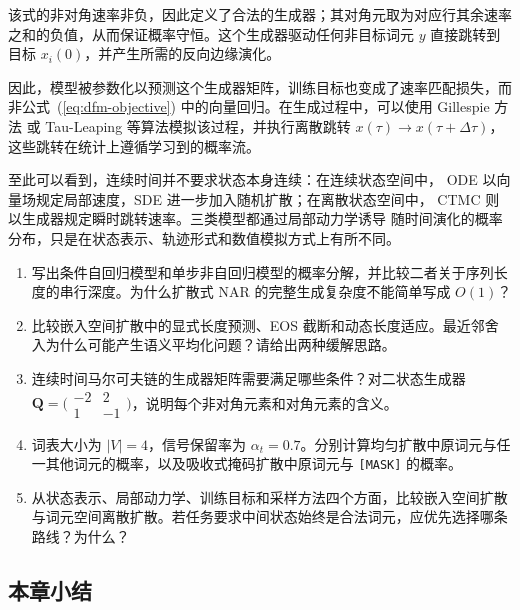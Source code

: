 \noindent 该式的非对角速率非负，因此定义了合法的生成器；其对角元取为对应行其余速率之和的负值，从而保证概率守恒。这个生成器驱动任何非目标词元 $y$ 直接跳转到目标 $x_i(0)$，并产生所需的反向边缘演化。

因此，模型被参数化以预测这个生成器矩阵，训练目标也变成了速率匹配损失，而非公式~(\ref{eq:dfm-objective}) 中的向量回归。在生成过程中，可以使用 Gillespie 方法 \citep{gillespie:1977exact} 或 Tau-Leaping \citep{gillespie:2001approximate} 等算法模拟该过程，并执行离散跳转 $x(\tau) \to x(\tau+\Delta \tau)$，这些跳转在统计上遵循学习到的概率流。

至此可以看到，连续时间并不要求状态本身连续：在连续状态空间中，
ODE 以向量场规定局部速度，SDE 进一步加入随机扩散；在离散状态空间中，
CTMC 则以生成器规定瞬时跳转速率。三类模型都通过局部动力学诱导
随时间演化的概率分布，只是在状态表示、轨迹形式和数值模拟方式上有所不同。

\begin{exercisebox}
  \begin{enumerate}
    \item 写出条件自回归模型和单步非自回归模型的概率分解，并比较二者关于序列长度的串行深度。为什么扩散式 NAR 的完整生成复杂度不能简单写成 \(O(1)\)？
    \item 比较嵌入空间扩散中的显式长度预测、EOS 截断和动态长度适应。最近邻舍入为什么可能产生语义平均化问题？请给出两种缓解思路。
    \item 连续时间马尔可夫链的生成器矩阵需要满足哪些条件？对二状态生成器 \(\boldsymbol Q=\bigl(\begin{smallmatrix}-2&2\\1&-1\end{smallmatrix}\bigr)\)，说明每个非对角元素和对角元素的含义。
    \item 词表大小为 \(|V|=4\)，信号保留率为 \(\alpha_t=0.7\)。分别计算均匀扩散中原词元与任一其他词元的概率，以及吸收式掩码扩散中原词元与 \texttt{[MASK]} 的概率。
    \item 从状态表示、局部动力学、训练目标和采样方法四个方面，比较嵌入空间扩散与词元空间离散扩散。若任务要求中间状态始终是合法词元，应优先选择哪条路线？为什么？
  \end{enumerate}
\end{exercisebox}


\subsection{本章小结}
